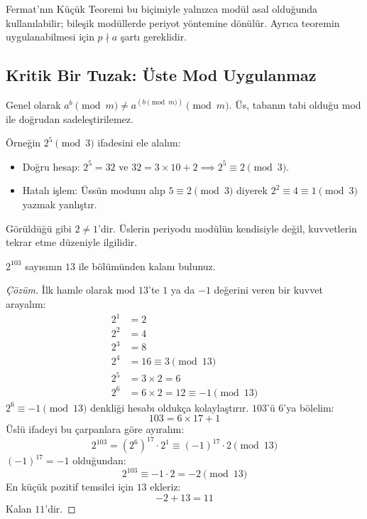 \begin{caution}
Fermat'nın Küçük Teoremi bu biçimiyle yalnızca modül asal olduğunda kullanılabilir; bileşik modüllerde periyot yöntemine dönülür. Ayrıca teoremin uygulanabilmesi için $p \nmid a$ şartı gereklidir.
\end{caution}

\subsection{Kritik Bir Tuzak: Üste Mod Uygulanmaz}

\begin{theorem}
Genel olarak $a^b \pmod m \ne a^{(b \pmod m)} \pmod m$. 
Üs, tabanın tabi olduğu mod ile doğrudan sadeleştirilemez.
\end{theorem}

Örneğin $2^5 \pmod 3$ ifadesini ele alalım:
\begin{itemize}
    \item Doğru hesap: $2^5 = 32$ ve $32 = 3 \times 10 + 2 \implies 2^5 \equiv 2 \pmod 3$.
    \item Hatalı işlem: Üssün modunu alıp $5 \equiv 2 \pmod 3$ diyerek $2^2 \equiv 4 \equiv 1 \pmod 3$ yazmak yanlıştır.
\end{itemize}
Görüldüğü gibi $2 \ne 1$'dir. Üslerin periyodu modülün kendisiyle değil, kuvvetlerin tekrar etme düzeniyle ilgilidir.

\begin{example}
$2^{103}$ sayısının $13$ ile bölümünden kalanı bulunuz.
\end{example}

\begin{proof}[Çözüm]
İlk hamle olarak mod $13$'te $1$ ya da $-1$ değerini veren bir kuvvet arayalım:
\begin{align*}
2^1 &= 2 \\
2^2 &= 4 \\
2^3 &= 8 \\
2^4 &= 16 \equiv 3 \pmod{13} \\
2^5 &= 3 \times 2 = 6 \\
2^6 &= 6 \times 2 = 12 \equiv -1 \pmod{13}
\end{align*}
$2^6 \equiv -1 \pmod{13}$ denkliği hesabı oldukça kolaylaştırır. $103$'ü $6$'ya bölelim:
\[
103 = 6 \times 17 + 1
\]
Üslü ifadeyi bu çarpanlara göre ayıralım:
\[
2^{103} = (2^6)^{17} \cdot 2^1 \equiv (-1)^{17} \cdot 2 \pmod{13}
\]
$(-1)^{17} = -1$ olduğundan:
\[
2^{103} \equiv -1 \cdot 2 = -2 \pmod{13}
\]
En küçük pozitif temsilci için $13$ ekleriz:
\[
-2 + 13 = 11
\]
Kalan $11$'dir.
\end{proof}

